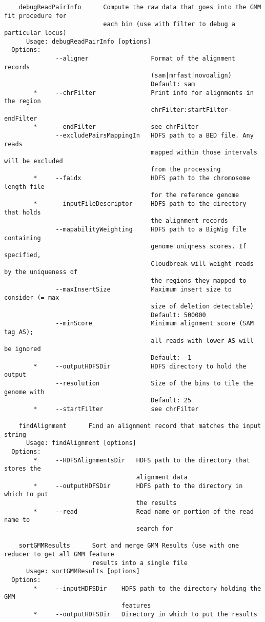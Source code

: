 \documentclass[11pt]{article}
\begin{document}
\begin{verbatim}
    debugReadPairInfo      Compute the raw data that goes into the GMM fit procedure for 
                           each bin (use with filter to debug a particular locus)
      Usage: debugReadPairInfo [options]
  Options:
              --aligner                 Format of the alignment records
                                        (sam|mrfast|novoalign)
                                        Default: sam
        *     --chrFilter               Print info for alignments in the region
                                        chrFilter:startFilter-endFilter
        *     --endFilter               see chrFilter
              --excludePairsMappingIn   HDFS path to a BED file. Any reads
                                        mapped within those intervals will be excluded
                                        from the processing
        *     --faidx                   HDFS path to the chromosome length file
                                        for the reference genome
        *     --inputFileDescriptor     HDFS path to the directory that holds
                                        the alignment records
              --mapabilityWeighting     HDFS path to a BigWig file containing
                                        genome uniqness scores. If specified,
                                        Cloudbreak will weight reads by the uniqueness of
                                        the regions they mapped to
              --maxInsertSize           Maximum insert size to consider (= max
                                        size of deletion detectable)
                                        Default: 500000
              --minScore                Minimum alignment score (SAM tag AS);
                                        all reads with lower AS will be ignored
                                        Default: -1
        *     --outputHDFSDir           HDFS directory to hold the output
              --resolution              Size of the bins to tile the genome with
                                        Default: 25
        *     --startFilter             see chrFilter

    findAlignment      Find an alignment record that matches the input string
      Usage: findAlignment [options]
  Options:
        *     --HDFSAlignmentsDir   HDFS path to the directory that stores the
                                    alignment data
        *     --outputHDFSDir       HDFS path to the directory in which to put
                                    the results
        *     --read                Read name or portion of the read name to
                                    search for

    sortGMMResults      Sort and merge GMM Results (use with one reducer to get all GMM feature 
                        results into a single file
      Usage: sortGMMResults [options]
  Options:
        *     --inputHDFSDir    HDFS path to the directory holding the GMM
                                features
        *     --outputHDFSDir   Directory in which to put the results
\end{verbatim}
\end{document}
